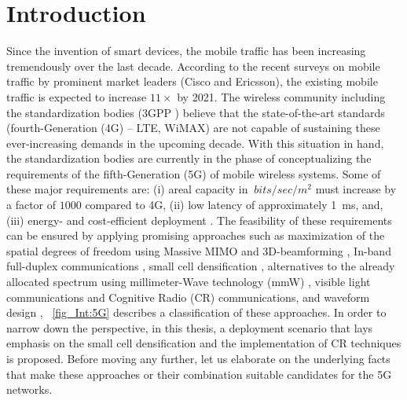 \chapter{Introduction}
\label{chap:Int}

Since the invention of smart devices, the mobile traffic has been increasing tremendously over the last decade. According to the recent surveys on mobile traffic by prominent market leaders (Cisco \cite{CISCO14} and Ericsson\cite{Eric15}), the existing mobile traffic is expected to increase $11 \times$ by 2021. The wireless community including the standardization bodies (3GPP \cite{3GPP}) believe that the state-of-the-art standards (fourth-Generation (4G) -- LTE, WiMAX) are not capable of sustaining these ever-increasing demands in the upcoming decade. With this situation in hand, the standardization bodies are currently in the phase of conceptualizing the requirements of the fifth-Generation (5G) of mobile wireless systems.
Some of these major requirements are: (i) areal capacity in $\SI{}{bits/sec/m^2}$ must increase by a factor of $1000$ compared to 4G, (ii) low latency of approximately \SI{1}{ms}, and, (iii) energy- and cost-efficient deployment \cite{Qual13, Andrews14}.
The feasibility of these requirements can be ensured by applying promising approaches such as maximization of the spatial degrees of freedom using Massive MIMO \cite{Lar14} and 3D-beamforming \cite{Hal13}, In-band full-duplex communications \cite{Sab14}, small cell densification \cite{Andrews12, Gel13}, alternatives to the already allocated spectrum using millimeter-Wave technology (mmW) \cite{Rapp13}, visible light communications \cite{Wu14} and Cognitive Radio (CR) communications, and waveform design \cite{Scha14, Baz15}, \figurename~\ref{fig_Int:5G} describes a classification of these approaches. In order to narrow down the perspective, in this thesis, a deployment scenario that lays emphasis on the small cell densification and the implementation of CR techniques is proposed. Before moving any further, let us elaborate on the underlying facts that make these approaches or their combination suitable candidates for the 5G networks. 

